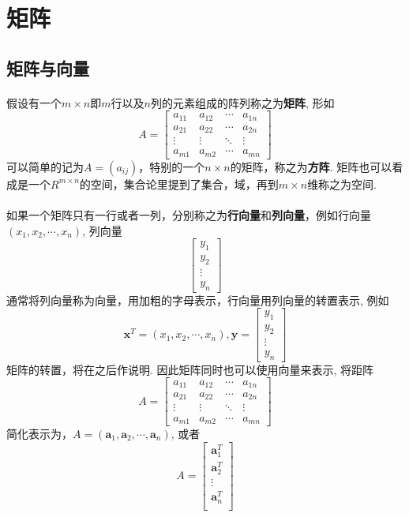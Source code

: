 \section{矩阵}

\subsection{矩阵与向量}
\paragraph{}
假设有一个$m \times n$即$m$行以及$n$列的元素组成的阵列称之为\textbf{矩阵}, 形如
\[
A=
  \begin{bmatrix}
    a_{11} & a_{12} & \cdots &  a_{1n} \\
    a_{21} & a_{22} & \cdots &  a_{2n} \\
    \vdots & \vdots & \ddots &  \vdots \\
    a_{m1} & a_{m2} & \cdots &  a_{mn}
  \end{bmatrix}
\]
可以简单的记为$A = (a_{ij})$，特别的一个$n\times n$的矩阵，称之为\textbf{方阵}. 矩阵也可以看成是一个$R^{m\times n}$的空间，集合论里提到了集合，域，再到$m \times n$维称之为空间. 

\paragraph{}
如果一个矩阵只有一行或者一列，分别称之为\textbf{行向量}和\textbf{列向量}，例如行向量$(x_1, x_2, \cdots, x_n)$, 列向量
$$
 \begin{bmatrix}
    y_1 \\
    y_2 \\
    \vdots \\
    y_n
\end{bmatrix}
$$
通常将列向量称为向量，用加粗的字母表示，行向量用列向量的转置表示, 例如
$$
\textbf{x}^T = (x_1, x_2, \cdots, x_n), \textbf{y} =   \begin{bmatrix}
    y_1 \\
    y_2 \\
    \vdots \\
    y_n
\end{bmatrix}
$$
矩阵的转置，将在之后作说明. 因此矩阵同时也可以使用向量来表示, 将距阵
\[
A=
  \begin{bmatrix}
    a_{11} & a_{12} & \cdots &  a_{1n} \\
    a_{21} & a_{22} & \cdots &  a_{2n} \\
    \vdots & \vdots & \ddots &  \vdots \\
    a_{m1} & a_{m2} & \cdots &  a_{mn}
  \end{bmatrix}
\]
简化表示为，$A = (\textbf{a}_1, \textbf{a}_2, \cdots, \textbf{a}_n)$, 或者
$$
A = \begin{bmatrix}
    \textbf{a}_1^T \\
    \textbf{a}_2^T \\
    \vdots  \\
    \textbf{a}_n^T \\
  \end{bmatrix}
$$


